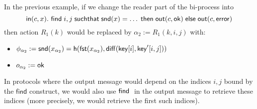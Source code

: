\begin{example}
  In the previous example, if we change the reader part of the bi-process into
  $$\mathsf{in}(c,x).~ \textsf{find}\; i,j \;\textsf{suchthat}\; \mathsf{snd}(x) = \ldots \;\textsf{then}\;
  \mathsf{out}(c,\mathsf{ok}) \;\textsf{else}\; \mathsf{out}(c,\mathsf{error})$$
  then action $R_1(k)$ would be replaced by $\alpha_2 := R_1(k,i,j)$
  with:
  \begin{itemize}
    \item $\phi_{\alpha_2} := \mathsf{snd}(x_{\alpha_2}) =
      \mathsf{h}(\mathsf{fst}(x_{\alpha_2}),\mathsf{diff}(\mathsf{key}[i],\mathsf{key}'[i,j]))$
    \item $o_{\alpha_2} := \mathsf{ok}$
  \end{itemize}
  In protocols where the output message would depend on the indices $i,j$
  bound by the $\mathsf{find}$ construct, we would also use $\textsf{find}\;$ in the
  output message to retrieve these indices (more precisely, we would retrieve
  the first such indices).
\end{example}

